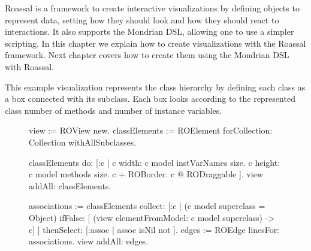 \documentclass[a4paper,10pt,twoside]{book}
\begin{document}
Roassal is a framework to create interactive visualizations by defining objects to represent data, setting how they should look and how they should react to interactions. It also supports the Mondrian DSL, allowing one to use a simpler scripting. In this chapter we explain how to create visualizations with the Roassal framework. Next chapter covers how to create them using the Mondrian DSL with Roassal.

This example visualization represents the  class hierarchy by defining each class as a box connected with its subclass. Each box looks according to the represented class number of methods and number of instance variables.

\begin{figure}[H]
      \begin{minipage}[t]{0.5\textwidth}
      \vspace{0pt}
\begin{code}{}
view := ROView new.
classElements := ROElement forCollection: Collection withAllSubclasses.

classElements 
	do: [:c | 
		c width: c model instVarNames size.
		c height: c model methods size.
		c + ROBorder. 
		c @ RODraggable ].
view addAll: classElements.

associations := classElements collect: [:c | 
	(c model superclass = Object)
		ifFalse: [ (view elementFromModel: c model superclass) -> c]
	 ] thenSelect: [:assoc | assoc isNil not ].
edges := ROEdge linesFor: associations.
view addAll: edges.


\end{code}
\end{minipage}
\end{figure}
\end{document}
